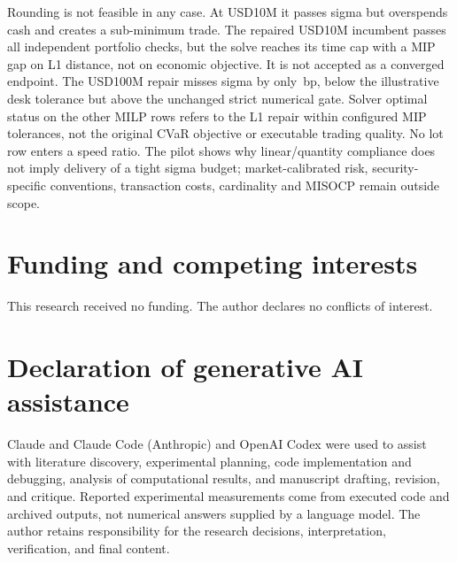 \documentclass[11pt,a4paper]{article}
\begin{document}
Rounding is not feasible in any case. At USD10M it passes sigma but overspends
cash and creates a sub-minimum trade. The repaired USD10M incumbent passes
all independent portfolio checks, but the solve reaches its time cap with a
\POneLotTenRepairGapPct{} MIP gap on L1 distance, not on economic objective.
It is not accepted as a converged endpoint. The USD100M repair misses sigma
by only \POneLotHundredRepairSigmaExcessBp\,bp, below the illustrative desk
tolerance but above the unchanged strict numerical gate. Solver optimal status
on the other MILP rows refers to the L1 repair within configured MIP tolerances,
not the original CVaR objective or executable trading quality. No lot row enters
a speed ratio. The pilot shows why linear/quantity compliance does not imply
delivery of a tight sigma budget; market-calibrated risk, security-specific
conventions, transaction costs, cardinality and MISOCP remain outside scope.

\section*{Funding and competing interests}

This research received no funding. The author declares no conflicts of interest.

\section*{Declaration of generative AI assistance}

Claude and Claude Code (Anthropic) and OpenAI Codex were used to assist with
literature discovery, experimental planning, code implementation and debugging,
analysis of computational results, and manuscript drafting, revision, and
critique. Reported experimental
measurements come from executed code and archived outputs, not numerical
answers supplied by a language model. The author retains responsibility for
the research decisions, interpretation, verification, and final content.

{\small}
\end{document}
